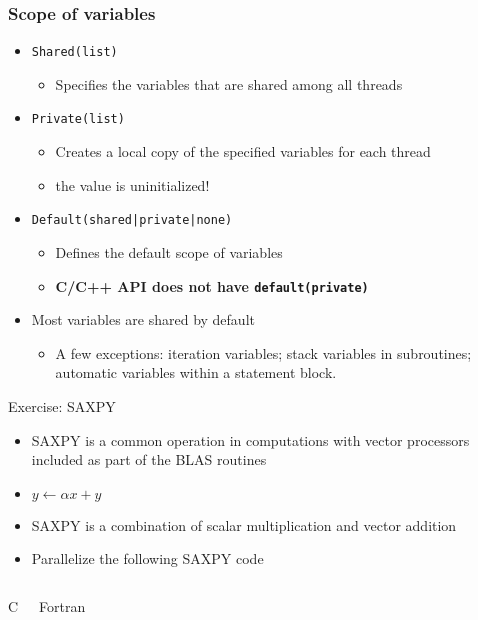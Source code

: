 \documentclass[c,mathserif,compress,xcolor=svgnames]{beamer}
\newenvironment{bblock}[0]
{
\begin{beamerboxesrounded}[upper=uppercol1,lower=lowercol1,shadow=true]}
{\end{beamerboxesrounded}}
\begin{document}
\begin{frame}
  \frametitle{\small Scope of variables}
  \begin{itemize}
    \item \texttt{Shared(list)}
    \begin{itemize}
      \item Specifies the variables that are shared among all threads
    \end{itemize}
    \item \texttt{Private(list)}
    \begin{itemize}
      \item Creates a local copy of the specified variables for each thread
      \item the value is uninitialized!
    \end{itemize}
    \item \texttt{Default(shared|private|none)}
    \begin{itemize}
      \item Defines the default scope of variables
      \item \textbf{C/C++ API does not have \texttt{default(private)}}
    \end{itemize}
    \item Most variables are shared by default
    \begin{itemize}
      \item A few exceptions: iteration variables; stack variables in subroutines; automatic variables within a statement block.
    \end{itemize}
  \end{itemize}
\end{frame}

\begin{frame}{\small Exercise: SAXPY}
  \begin{itemize}
    \item SAXPY is a common operation in computations with vector processors included as part of the BLAS routines
    \item[] $y\leftarrow \alpha x + y$
    \item SAXPY is a combination of scalar multiplication and vector addition
    \item Parallelize the following SAXPY code
  \end{itemize}
  \begin{columns}
    \begin{bblock}{C}
      
    \end{bblock}
    \begin{bblock}{Fortran}
      
    \end{bblock}
  \end{columns}
\end{frame}
\end{document}
